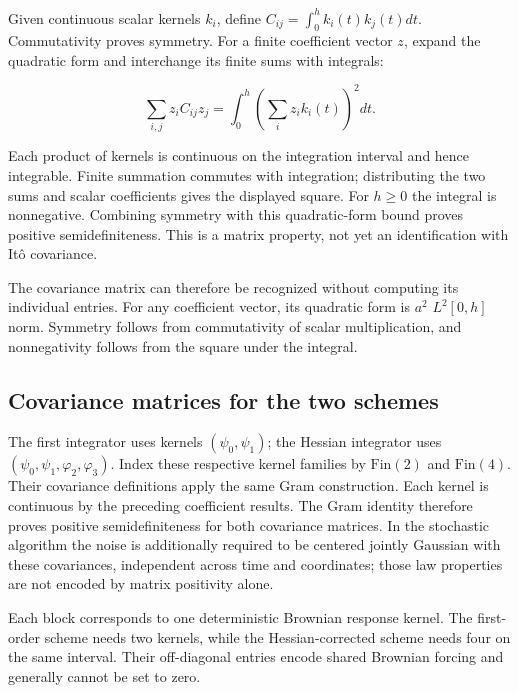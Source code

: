 \documentclass[11pt,a4paper]{report}
\begin{document}
Given continuous scalar kernels \(k_i\), define \(C_{ij}=\int_0^hk_i(t)k_j(t)dt\). Commutativity proves symmetry. For a finite coefficient vector \(z\), expand the quadratic form and interchange its finite sums with integrals:

\[\sum_{i,j}z_iC_{ij}z_j=\int_0^h\left(\sum_i z_ik_i(t)\right)^2dt.\]

Each product of kernels is continuous on the integration interval and hence integrable. Finite summation commutes with integration; distributing the two sums and scalar coefficients gives the displayed square. For \(h\ge0\) the integral is nonnegative. Combining symmetry with this quadratic-form bound proves positive semidefiniteness. This is a matrix property, not yet an identification with Itô covariance.



The covariance matrix can therefore be recognized without computing its individual entries. For any coefficient vector, its quadratic form is \(a^2\) \(L^2[0,h]\) norm. Symmetry follows from commutativity of scalar multiplication, and nonnegativity follows from the square under the integral.

\subsection{\texorpdfstring{Covariance matrices for the two schemes}{Covariance matrices for the two schemes}}
\label{report-step-KineticLangevin-Coefficients-lean-9}


The first integrator uses kernels \((\psi_0,\psi_1)\); the Hessian integrator uses \((\psi_0,\psi_1,\varphi_2,\varphi_3)\). Index these respective kernel families by \(\mathrm{Fin}(2)\) and \(\mathrm{Fin}(4)\). Their covariance definitions apply the same Gram construction. Each kernel is continuous by the preceding coefficient results. The Gram identity therefore proves positive semidefiniteness for both covariance matrices. In the stochastic algorithm the noise is additionally required to be centered jointly Gaussian with these covariances, independent across time and coordinates; those law properties are not encoded by matrix positivity alone.



Each block corresponds to one deterministic Brownian response kernel. The first-order scheme needs two kernels, while the Hessian-corrected scheme needs four on the same interval. Their off-diagonal entries encode shared Brownian forcing and generally cannot be set to zero.
\end{document}
